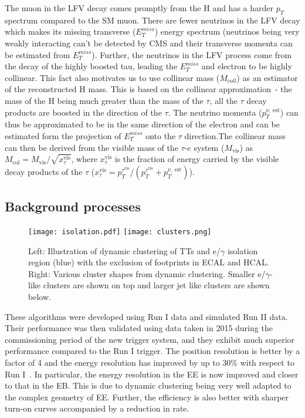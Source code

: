 \documentclass[a4paper,11pt]{article}
\begin{document}
The muon in the LFV decay comes promptly from the H and has a harder $p_{T}$ spectrum compared to the SM muon. There are fewer neutrinos in the LFV decay which makes its missing transverse ($E_{T}^{miss}$) energy spectrum (neutrinos being very weakly interacting can't be detected by CMS and their transverse momenta can be estimated from $E_{T}^{miss}$). Further, the neutrinos in the LFV process come from the decay of the highly boosted tau, leading the $E_{T}^{miss}$ and electron to be highly collinear. This fact also motivates us to use collinear mass ($M_{coll}$) as an estimator of the reconstructed H mass. This is based on the collinear approximation~\cite{h}- the mass of the H being much greater than the mass of the $\tau$, all the $\tau$ decay products are boosted in the direction of the $\tau$. The neutrino momenta ($p_{T}^{\nu,~\text{est}}$) can thus be approximated to be in the same direction of the electron and can be estimated form the projection of $E_{T}^{miss}$ onto the $\tau$ direction.The collinear mass can then be derived from the visible mass of the $\tau$-$e$ system ($M_{\text{vis}}$) as $M_{\text{col}}= M_{\text{vis}} / \sqrt{x_{\tau}^\text{vis}}$, where $x_{\tau}^\text{vis}$ is the fraction of energy carried by the visible decay products of the $\tau$ ($x_{\tau}^\text{vis}={p_{T}^{\tau^{\text{vis}}}}/{(p_{T}^{\tau^\text{vis}}+p_{T}^{\nu,~\text{est}})}$).

\subsection{Background processes}

\begin{figure}[htbp]
\centering %
\texttt{[image: isolation.pdf]}
\qquad
\texttt{[image: clusters.png]}
\caption{\label{fig:k} Left: Illustration of dynamic clustering of TTs and e/$\gamma$ isolation region (blue) with the exclusion of footprints in ECAL and HCAL. Right: Various cluster shapes from dynamic clustering. Smaller e/$\gamma$-like clusters are shown on top and larger jet like clusters are shown below.}
\end{figure}


These algorithms were developed using Run I data and simulated Run II data. Their performance was then validated using data taken in 2015 during the commissioning period of the new trigger system, and they exhibit much superior performance compared to the Run I trigger. The position resolution is better by  a factor of 4 and the energy resolution has improved by up to 30\% with respect to Run I~\cite{h}. In particular, the energy resolution in the EE is now improved and closer to that in the EB. This is due to dynamic clustering being very well adapted to the complex geometry of EE. Further, the efficiency is also better with sharper turn-on curves accompanied by a reduction in rate.
\end{document}
